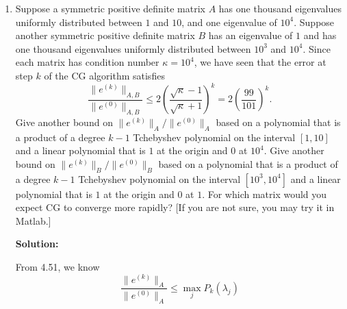 \documentclass[letterpaper,12pt]{article}
\begin{document}
\begin{enumerate}
\item 
Suppose a symmetric positive definite matrix $A$ has one thousand eigenvalues
uniformly distributed between $1$ and $10$, and one eigenvalue of $10^4$.
Suppose another symmetric positive definite matrix $B$ has an eigenvalue
of $1$ and has one thousand eigenvalues uniformly distributed between $10^3$
and $10^4$.
Since each matrix has condition number $\kappa = 10^4$, we have seen
that the error at step $k$ of the CG algorithm satisfies
\[
\frac{\| e^{(k)} \|_{A,B}}{\| e^{(0)} \|_{A,B}} \leq 2 \left( \frac{
\sqrt{\kappa} - 1}{\sqrt{\kappa} +1} \right)^k = 2 \left( \frac{99}{101} 
\right)^k .
\]
Give another bound on $\| e^{(k)} \|_A / \| e^{(0)} \|_A$ based
on a polynomial that is a product of a degree $k-1$ Tchebyshev polynomial
on the interval $[1,10]$ and a linear polynomial that is $1$ at the
origin and $0$ at $10^4$.  Give another bound on $\| e^{(k)} \|_B /
\| e^{(0)} \|_B$ based on a polynomial that is a product of a degree $k-1$ 
Tchebyshev polynomial on the interval $[ 10^3 , 10^4]$ and a linear polynomial
that is $1$ at the origin and $0$ at $1$.  For which matrix would you
expect CG to converge more rapidly?  [If you are not sure, you may try
it in Matlab.]

{\bf Solution:}

From 4.51, we know
\[
\frac{\| e^{(k)} \|_{A}}{\| e^{(0)} \|_{A}} \leq \max_j P_k(\lambda_j)
\]


\end{enumerate}
\end{document}
